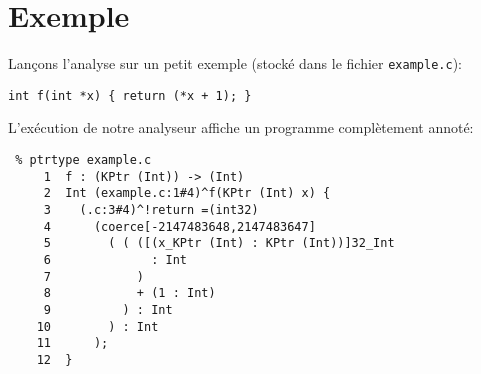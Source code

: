 \section{Exemple}
\label{sec:impl-ex}

Lançons l'analyse sur un petit exemple (stocké dans le fichier
\texttt{example.c}):

\begin{verbatim}
int f(int *x) { return (*x + 1); }
\end{verbatim}

L'exécution de notre analyseur affiche un programme complètement annoté:

\begin{verbatim}
 % ptrtype example.c
     1	f : (KPtr (Int)) -> (Int)
     2	Int (example.c:1#4)^f(KPtr (Int) x) {
     3	  (.c:3#4)^!return =(int32)
     4	    (coerce[-2147483648,2147483647]
     5	      ( ( ([(x_KPtr (Int) : KPtr (Int))]32_Int
     6	            : Int
     7	          )
     8	          + (1 : Int)
     9	        ) : Int
    10	      ) : Int
    11	    );
    12	}
\end{verbatim}

